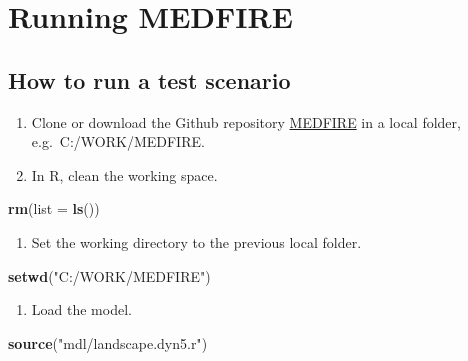 \documentclass[
]{article}
\newenvironment{Shaded}{\begin{snugshade}}{\end{snugshade}}
\newcommand{\DataTypeTok}[1]{\textcolor[rgb]{0.13,0.29,0.53}{#1}}
\newcommand{\KeywordTok}[1]{\textcolor[rgb]{0.13,0.29,0.53}{\textbf{#1}}}
\newcommand{\NormalTok}[1]{#1}
\newcommand{\StringTok}[1]{\textcolor[rgb]{0.31,0.60,0.02}{#1}}
\providecommand{\tightlist}{%
  \setlength{\itemsep}{0pt}\setlength{\parskip}{0pt}}
\begin{document}
\hypertarget{running-medfire}{%
\section{Running MEDFIRE}\label{running-medfire}}

\hypertarget{how-to-run-a-test-scenario}{%
\subsection{How to run a test
scenario}\label{how-to-run-a-test-scenario}}

\begin{enumerate}
\def\labelenumi{\arabic{enumi}.}
\item
  Clone or download the Github repository
  \href{https://github.com/nuaquilue/MEDFIRE}{MEDFIRE} in a local
  folder, e.g.~C:/WORK/MEDFIRE.
\item
  In R, clean the working space.
\end{enumerate}

\begin{Shaded}
\begin{Highlighting}[]
\KeywordTok{rm}\NormalTok{(}\DataTypeTok{list =} \KeywordTok{ls}\NormalTok{())}
\end{Highlighting}
\end{Shaded}

\begin{enumerate}
\def\labelenumi{\arabic{enumi}.}
\setcounter{enumi}{2}
\tightlist
\item
  Set the working directory to the previous local folder.
\end{enumerate}

\begin{Shaded}
\begin{Highlighting}[]
\KeywordTok{setwd}\NormalTok{(}\StringTok{"C:/WORK/MEDFIRE"}\NormalTok{)}
\end{Highlighting}
\end{Shaded}

\begin{enumerate}
\def\labelenumi{\arabic{enumi}.}
\setcounter{enumi}{3}
\tightlist
\item
  Load the model.
\end{enumerate}

\begin{Shaded}
\begin{Highlighting}[]
\KeywordTok{source}\NormalTok{(}\StringTok{"mdl/landscape.dyn5.r"}\NormalTok{)}
\end{Highlighting}
\end{Shaded}
\end{document}
